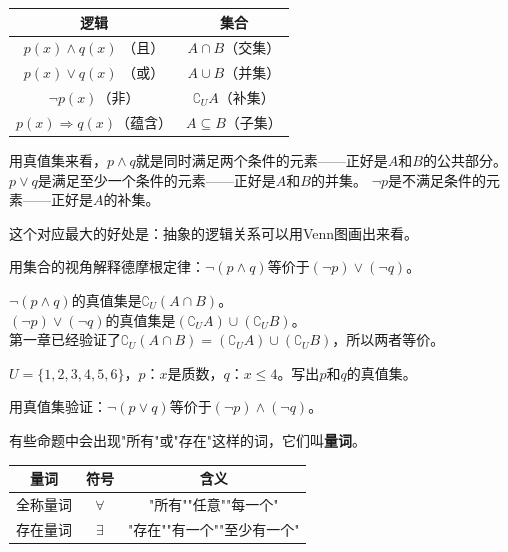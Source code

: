 \begin{center}
\begin{tabular}{c|c}
逻辑 & 集合 \\ \hline
$p(x)\land q(x)$ （且） & $A\cap B$（交集）\\
$p(x)\lor q(x)$ （或） & $A\cup B$（并集）\\
$\lnot p(x)$（非） & $\complement_U A$（补集）\\
$p(x)\Rightarrow q(x)$（蕴含） & $A\subseteq B$（子集）
\end{tabular}
\end{center}

用真值集来看，$p\land q$就是同时满足两个条件的元素——正好是$A$和$B$的公共部分。
$p\lor q$是满足至少一个条件的元素——正好是$A$和$B$的并集。
$\lnot p$是不满足条件的元素——正好是$A$的补集。

这个对应最大的好处是：抽象的逻辑关系可以用Venn图画出来看。

\begin{example}
用集合的视角解释德摩根定律：$\lnot(p\land q)$等价于$(\lnot p)\lor(\lnot q)$。
\end{example}
\begin{solution}
$\lnot(p\land q)$的真值集是$\complement_U(A\cap B)$。\\
$(\lnot p)\lor(\lnot q)$的真值集是$(\complement_U A)\cup(\complement_U B)$。\\
第一章已经验证了$\complement_U(A\cap B)=(\complement_U A)\cup(\complement_U B)$，所以两者等价。
\end{solution}

\begin{exercise}
\item $U=\{1,2,3,4,5,6\}$，$p$：$x$是质数，$q$：$x\le4$。写出$p$和$q$的真值集。
\item 用真值集验证：$\lnot(p\lor q)$等价于$(\lnot p)\land(\lnot q)$。
\end{exercise}


有些命题中会出现"所有"或"存在"这样的词，它们叫\textbf{量词}。

\begin{center}
\begin{tabular}{c|c|c}
量词 & 符号 & 含义 \\ \hline
全称量词 & $\forall$ & "所有""任意""每一个" \\
存在量词 & $\exists$ & "存在""有一个""至少有一个"
\end{tabular}
\end{center}


